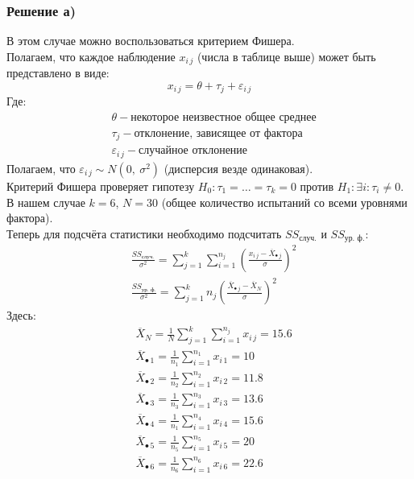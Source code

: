 \documentclass[12pt, a4paper]{article}
\begin{document}
\subsubsection*{Решение а)}
В этом случае можно воспользоваться критерием Фишера.\\
Полагаем, что каждое наблюдение $x_{i\, j}$ (числа в таблице выше) может быть представлено в виде:
\[x_{i\, j} = \theta + \tau_{j} + \varepsilon_{i\, j} \]
Где:
\begin{equation*}
    \begin{aligned}
        &\theta - \text{некоторое неизвестное общее среднее}\\
        &\tau_{j} - \text{отклонение, зависящее от фактора}\\
        &\varepsilon_{i\, j} - \text{случайное отклонение}
    \end{aligned}
\end{equation*}
Полагаем, что $\varepsilon_{i\, j} \sim N(0,\ \sigma^2)$ (дисперсия везде одинаковая).\\
Критерий Фишера проверяет гипотезу $H_0: \tau_1 = \dots = \tau_k = 0$ против $H_1: \exists i: \tau_{i} \neq 0$. В нашем случае $k = 6$, $N = 30$ (общее количество испытаний со всеми уровнями фактора).\\
Теперь для подсчёта статистики необходимо подсчитать $SS_{\text{случ.}}$ и $SS_{\text{ур. ф.}}$:
\begin{equation*}
    \begin{aligned}
        & \frac{SS_{\text{случ.}}}{\sigma^2} = \sum_{j = 1}^{k} \sum_{i = 1}^{n_j} {\left( \frac{x_{i\, j} - \overline{X}_{\bullet\, j}}{\sigma} \right)}^2\\
        & \frac{SS_{\text{ур. ф.}}}{\sigma^2} = \sum_{j = 1}^k n_j {\left( \frac{\overline{X}_{\bullet\, j} - \overline{X}_N}{\sigma} \right)}^2
    \end{aligned}
\end{equation*}
Здесь:
\begin{equation*}
    \begin{aligned}
        & \overline{X}_N = \frac{1}{N} \sum_{j = 1}^{k} \sum_{i = 1}^{n_j} x_{i\, j} = 15.6\\
        & \overline{X}_{\bullet\, 1} = \frac{1}{n_1}\sum_{i = 1}^{n_1} x_{i\, 1} = 10\\
        & \overline{X}_{\bullet\, 2} = \frac{1}{n_2}\sum_{i = 1}^{n_2} x_{i\, 2} = 11.8\\
        & \overline{X}_{\bullet\, 3} = \frac{1}{n_3}\sum_{i = 1}^{n_3} x_{i\, 3} = 13.6\\
        & \overline{X}_{\bullet\, 4} = \frac{1}{n_1}\sum_{i = 1}^{n_4} x_{i\, 4} = 15.6\\
        & \overline{X}_{\bullet\, 5} = \frac{1}{n_5}\sum_{i = 1}^{n_5} x_{i\, 5} = 20\\
        & \overline{X}_{\bullet\, 6} = \frac{1}{n_6}\sum_{i = 1}^{n_6} x_{i\, 6} = 22.6
    \end{aligned}
\end{equation*}
\end{document}
